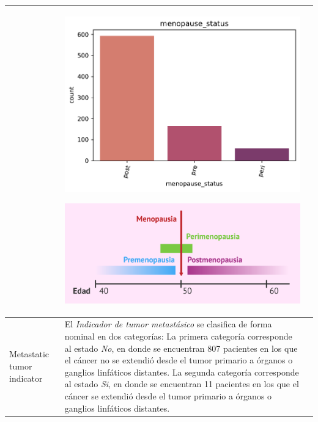 \begin{table}[!htb]
\begin{threeparttable}
\begin{tabular}{p{2.5cm} p{7cm} p{6.5cm}}
			& \begin{center}\includegraphics[width=1\linewidth]{NOTEBOOK/IMAGENES_DESCRIPTIVAS/25_menopause_status}\end{center}
			  \begin{center}\includegraphics[width=1\linewidth]{IMAGENES/menopausia}\end{center}
			\\ \hline
			
			Metastatic tumor indicator
			& El \textit{Indicador de tumor metastásico} se clasifica de forma nominal en dos categorías: La primera categoría corresponde al estado \textit{No}, en donde se encuentran 807 pacientes en los que el cáncer no se extendió desde el tumor primario a órganos o ganglios linfáticos distantes. La segunda categoría corresponde al estado \textit{Si}, en donde se encuentran 11 pacientes en los que el cáncer se extendió desde el tumor primario a órganos o ganglios linfáticos distantes.
			

\end{tabular}
\end{threeparttable}
\end{table}
